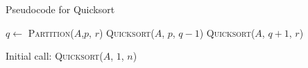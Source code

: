 \documentclass{beamer}
\begin{document}

\begin{frame}{Pseudocode for Quicksort}
        \begin{algorithm}[H]
            \begin{algorithmic}[1]
                        \State $q \leftarrow$ \textsc{Partition}($A$,$p$, $r$)
                        \State \textsc{Quicksort}($A$, $p$, $q - 1$)
                        \State \textsc{Quicksort}($A$, $q + 1$, $r$)
                    \EndIf
                \EndProcedure
            \end{algorithmic}
        \end{algorithm}
        \pause
        \begin{alertblock}{Initial call:}
            \textsc{Quicksort}($A$, $1$, $n$)
        \end{alertblock}
\end{frame}
\end{document}
